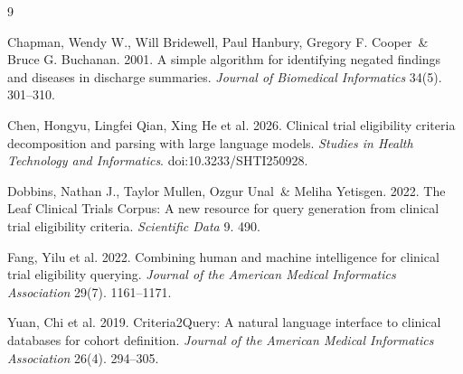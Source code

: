 \documentclass[12pt]{article}
\begin{document}
\vspace{-0.3em}
\begin{thebibliography}{9}
\setlength{\itemsep}{0pt}
\setlength{\parskip}{0pt}

Chapman, Wendy W., Will Bridewell, Paul Hanbury, Gregory F. Cooper \,\& Bruce G. Buchanan. 2001.
\newblock A simple algorithm for identifying negated findings and diseases in discharge summaries.
\newblock \textit{Journal of Biomedical Informatics} 34(5). 301--310.

Chen, Hongyu, Lingfei Qian, Xing He et al. 2026.
\newblock Clinical trial eligibility criteria decomposition and parsing with large language models.
\newblock \textit{Studies in Health Technology and Informatics}. doi:10.3233/SHTI250928.

Dobbins, Nathan J., Taylor Mullen, Ozgur Unal \,\& Meliha Yetisgen. 2022.
\newblock The Leaf Clinical Trials Corpus: A new resource for query generation from clinical trial eligibility criteria.
\newblock \textit{Scientific Data} 9. 490.

Fang, Yilu et al. 2022.
\newblock Combining human and machine intelligence for clinical trial eligibility querying.
\newblock \textit{Journal of the American Medical Informatics Association} 29(7). 1161--1171.

Yuan, Chi et al. 2019.
\newblock Criteria2Query: A natural language interface to clinical databases for cohort definition.
\newblock \textit{Journal of the American Medical Informatics Association} 26(4). 294--305.

\end{thebibliography}
\end{document}
